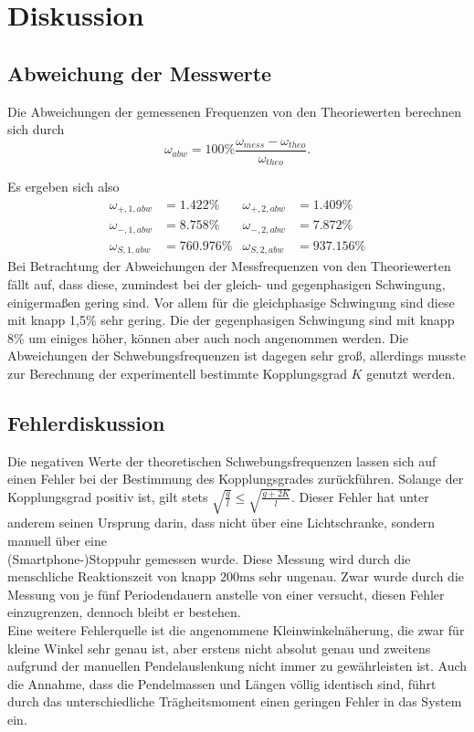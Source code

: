 \section{Diskussion}
\label{sec:Diskussion}

\subsection{Abweichung der Messwerte}
Die Abweichungen der gemessenen Frequenzen von den Theoriewerten berechnen sich durch
\begin{equation}
    ω_{abw} = 100\% \frac{ω_{mess}-ω_{theo}}{ω_{theo}} \text{.}
\end{equation}

Es ergeben sich also
\begin{align}
ω_{+,1,abw} & = 1.422\%   & ω_{+,2,abw} & = 1.409\% \\
ω_{-,1,abw} & = 8.758\%   & ω_{-,2,abw} & = 7.872\%\\
ω_{S,1,abw} & = 760.976\% & ω_{S,2,abw} & = 937.156\%
\end{align}
Bei Betrachtung der Abweichungen der Messfrequenzen von den Theoriewerten fällt auf, dass diese, zumindest
bei der gleich- und gegenphasigen Schwingung, einigermaßen gering sind. Vor allem für die gleichphasige Schwingung
sind diese mit knapp 1,5\% sehr gering. Die der gegenphasigen Schwingung sind mit knapp 8\% um einiges höher, können aber auch noch angenommen werden.
Die Abweichungen der Schwebungsfrequenzen ist dagegen sehr groß, allerdings musste zur Berechnung der experimentell
bestimmte Kopplungsgrad $K$ genutzt werden.

\subsection{Fehlerdiskussion}

Die negativen Werte der theoretischen Schwebungsfrequenzen lassen sich auf einen Fehler bei der Bestimmung des Kopplungsgrades zurückführen.
Solange der Kopplungsgrad positiv ist, gilt stets $\sqrt{\frac{g}{l}}\leq \sqrt{\frac{g+2K}{l}}$.
Dieser Fehler hat unter anderem seinen Ursprung darin, dass nicht über eine Lichtschranke, sondern manuell über eine \\
(Smartphone-)Stoppuhr gemessen wurde. Diese Messung wird durch die menschliche Reaktionszeit von knapp $200 \unit{\milli\second}$ sehr ungenau.
Zwar wurde durch die Messung von je fünf Periodendauern anstelle von einer versucht, diesen Fehler einzugrenzen, dennoch bleibt er bestehen. \\

Eine weitere Fehlerquelle ist die angenommene Kleinwinkelnäherung, die zwar für kleine Winkel sehr genau ist, aber erstens nicht absolut genau und zweitens aufgrund der manuellen
Pendelauslenkung nicht immer zu gewährleisten ist. Auch die Annahme, dass die Pendelmassen und Längen völlig identisch sind, führt durch das unterschiedliche Trägheitsmoment einen geringen Fehler
in das System ein.
